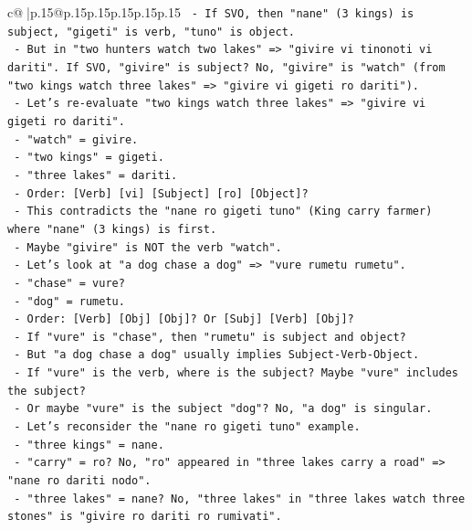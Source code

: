 \documentclass{article}
\begin{document}
{\begin{supertabular}{c@{$\;$}|p{.15\linewidth}@{}p{.15\linewidth}p{.15\linewidth}p{.15\linewidth}p{.15\linewidth}p{.15\linewidth}}
{{{\texttt{      {-} If SVO, then "nane" (3 kings) is subject, "gigeti" is verb, "tuno" is object.} \\
\texttt{      {-} But in "two hunters watch two lakes" => "givire vi tinonoti vi dariti". If SVO, "givire" is subject? No, "givire" is "watch" (from "two kings watch three lakes" => "givire vi gigeti ro dariti").} \\
\texttt{      {-} Let's re{-}evaluate "two kings watch three lakes" => "givire vi gigeti ro dariti".} \\
\texttt{        {-} "watch" = givire.} \\
\texttt{        {-} "two kings" = gigeti.} \\
\texttt{        {-} "three lakes" = dariti.} \\
\texttt{        {-} Order: {[}Verb{]} {[}vi{]} {[}Subject{]} {[}ro{]} {[}Object{]}?} \\
\texttt{        {-} This contradicts the "nane ro gigeti tuno" (King carry farmer) where "nane" (3 kings) is first.} \\
\texttt{        {-} Maybe "givire" is NOT the verb "watch".} \\
\texttt{        {-} Let's look at "a dog chase a dog" => "vure rumetu rumetu".} \\
\texttt{          {-} "chase" = vure?} \\
\texttt{          {-} "dog" = rumetu.} \\
\texttt{          {-} Order: {[}Verb{]} {[}Obj{]} {[}Obj{]}? Or {[}Subj{]} {[}Verb{]} {[}Obj{]}?} \\
\texttt{          {-} If "vure" is "chase", then "rumetu" is subject and object?} \\
\texttt{          {-} But "a dog chase a dog" usually implies Subject{-}Verb{-}Object.} \\
\texttt{          {-} If "vure" is the verb, where is the subject? Maybe "vure" includes the subject?} \\
\texttt{          {-} Or maybe "vure" is the subject "dog"? No, "a dog" is singular.} \\
\texttt{          {-} Let's reconsider the "nane ro gigeti tuno" example.} \\
\texttt{            {-} "three kings" = nane.} \\
\texttt{            {-} "carry" = ro? No, "ro" appeared in "three lakes carry a road" => "nane ro dariti nodo".} \\
\texttt{            {-} "three lakes" = nane? No, "three lakes" in "three lakes watch three stones" is "givire ro dariti ro rumivati".} \\
}}}
\end{supertabular}}
\end{document}
